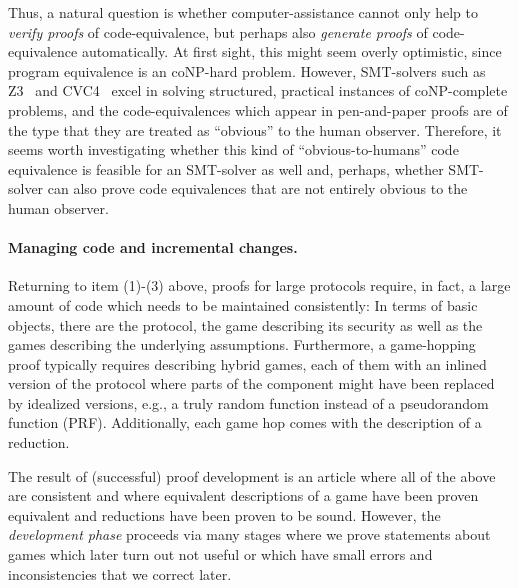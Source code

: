 
Thus, a natural question is whether computer-assistance cannot only help to
\emph{verify proofs} of code-equivalence, but perhaps also 
\emph{generate proofs} of code-equivalence automatically. At first sight,
this might seem overly optimistic, since program equivalence is an coNP-hard problem.
However, SMT-solvers such as Z3~\cite{X} and CVC4~\cite{X} excel in 
solving structured, practical instances of coNP-complete problems, and
the code-equivalences which appear in pen-and-paper proofs are of the type that 
they are treated as ``obvious'' to the human observer. Therefore, it seems
worth investigating whether this kind of ``obvious-to-humans'' code equivalence
is feasible for an SMT-solver as well and, perhaps, whether SMT-solver can also prove code equivalences that are not entirely obvious to the human observer.



\paragraph{Managing code and incremental changes.}
Returning to item (1)-(3) above, proofs for large protocols require, in fact,
a large amount of code which needs to be maintained consistently: In terms of
basic objects, there are the protocol, the game describing its security as well
 as the games describing the underlying assumptions. Furthermore, a game-hopping
proof typically requires describing hybrid games, each of them with an inlined
version of the protocol where parts of the component might have been replaced
by idealized versions, e.g., a truly random function instead of a pseudorandom function (PRF). Additionally, each game hop comes with the description of a reduction.

The result of (successful) proof development is an article where all of the
above are consistent and where equivalent descriptions of a game have
been proven equivalent and reductions have been proven to be sound.
However, the \emph{development phase} proceeds via many stages where
we prove statements about games which later turn out not useful or
which have small errors and inconsistencies that we correct later.

